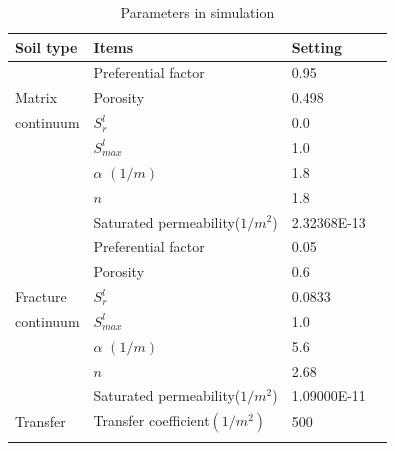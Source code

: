 \begin{table}[H]
 \centering
 \caption{Parameters in simulation}
 \centering \label{us:Dual-line-setting}
 \begin{tabular}{llll}
 \hline\hline\noalign{\smallskip}
 Soil type       & Items    & Setting   \\ \hline
                 &  Preferential factor   & 0.95    \\
Matrix           &  Porosity              & 0.498   \\
continuum        &  $S_r^l$               & 0.0    \\
                 &  $S_{max}^l$           & 1.0      \\
                 &  $\alpha$ $(1/m)$      & 1.8       \\
                 &  $n$                   & 1.8     \\
                 &  Saturated permeability($1/m^2$) & 2.32368E-13  \\
\hline
                 &  Preferential factor   & 0.05   \\
                 &  Porosity           & 0.6       \\
Fracture         &  $S_r^l$            & 0.0833    \\
continuum        &  $S_{max}^l$        & 1.0       \\
                 &  $\alpha$ $(1/m)$   & 5.6       \\
                 &  $n$                & 2.68      \\
                 &  Saturated permeability($1/m^2$) & 1.09000E-11 \\
\hline
 Transfer    &  Transfer coefficient$(1/m^2)$  &  500  \\
 \noalign{\smallskip}\hline\hline
 \end{tabular}
\end{table}
